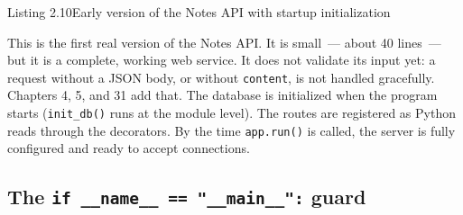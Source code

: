 \begin{codeboxcap}{\textcolor{accent}{Listing 2.10}\enspace Early version of the Notes API with startup initialization}
\begin{Shaded}
\begin{Highlighting}[]
\NormalTok{(}\OperatorTok{=}\NormalTok{[}\NormalTok{])}
\OperatorTok{=}
\OperatorTok{=}\NormalTok{, }\NormalTok{)}
\OperatorTok{=}
\OperatorTok{=}
\NormalTok{    )}
\OperatorTok{=}

  \OperatorTok{==} \NormalTok{:}
\OperatorTok{=}\NormalTok{)}
\end{Highlighting}
\end{Shaded}

\end{codeboxcap}

\noindent{}This is the first real version of the Notes API. It is small~--- about 40 lines~--- but it is a complete, working web service. It does not validate its input yet: a request without a JSON body, or without \texttt{content}, is not handled gracefully. Chapters 4, 5, and 31 add that. The database is initialized when the program starts (\texttt{init\_db()} runs at the module level). The routes are registered as Python reads through the decorators. By the time \texttt{app.run()} is called, the server is fully configured and ready to accept connections.

\subsection*{\texorpdfstring{The
\texttt{if\ \_}\allowbreak{}\texttt{\_}\allowbreak{}\texttt{name\_}\allowbreak{}\texttt{\_}\allowbreak{}\texttt{\ =}\allowbreak{}\texttt{=}\allowbreak{}\texttt{\ "\_}\allowbreak{}\texttt{\_}\allowbreak{}\texttt{main\_}\allowbreak{}\texttt{\_}\allowbreak{}\texttt{":}
guard}{The  guard}}\label{02-runtime-initialization:the-if---name------main---guard}

